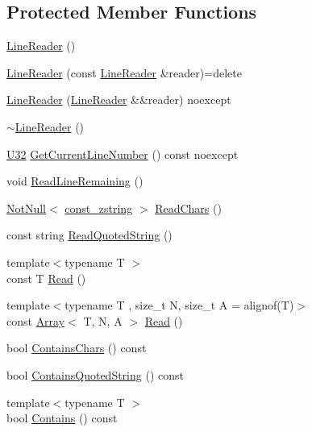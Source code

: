 \subsection*{Protected Member Functions}
\begin{DoxyCompactItemize}
\item 
\mbox{\hyperlink{classmage_1_1_line_reader_ab4a46321d7ea3ecda2d6390c78a7285b}{Line\+Reader}} ()
\item 
\mbox{\hyperlink{classmage_1_1_line_reader_ae4f871bebae110704b34c0bd88460639}{Line\+Reader}} (const \mbox{\hyperlink{classmage_1_1_line_reader}{Line\+Reader}} \&reader)=delete
\item 
\mbox{\hyperlink{classmage_1_1_line_reader_ae90c546a98e113a48ca1c94b854a4866}{Line\+Reader}} (\mbox{\hyperlink{classmage_1_1_line_reader}{Line\+Reader}} \&\&reader) noexcept
\item 
\mbox{\hyperlink{classmage_1_1_line_reader_ad9753ea392ebe5b3867852d3392fb1e7}{$\sim$\+Line\+Reader}} ()
\item 
\mbox{\hyperlink{namespacemage_a41c104c036fba3756a74e19f793eeaa1}{U32}} \mbox{\hyperlink{classmage_1_1_line_reader_aa0ed768e2799b74f2341c56fc6ac4969}{Get\+Current\+Line\+Number}} () const noexcept
\item 
void \mbox{\hyperlink{classmage_1_1_line_reader_a3a4b99bfef1e8a826d74a01bcc663fcb}{Read\+Line\+Remaining}} ()
\item 
\mbox{\hyperlink{namespacemage_a8769f9d670d6b585ea306cb1062af94b}{Not\+Null}}$<$ \mbox{\hyperlink{namespacemage_abfd9206dc607ceb5d13ec68bf075a5c0}{const\+\_\+zstring}} $>$ \mbox{\hyperlink{classmage_1_1_line_reader_afcb163cbc75ad1650437d809bbbc2d9b}{Read\+Chars}} ()
\item 
const string \mbox{\hyperlink{classmage_1_1_line_reader_ae9a7547d01b29c3237b198444d4f3aef}{Read\+Quoted\+String}} ()
\item 
{\footnotesize template$<$typename T $>$ }\\const T \mbox{\hyperlink{classmage_1_1_line_reader_a9bbad433ab93ce012aec7155adafbedb}{Read}} ()
\item 
{\footnotesize template$<$typename T , size\+\_\+t N, size\+\_\+t A = alignof(\+T)$>$ }\\const \mbox{\hyperlink{structmage_1_1_array}{Array}}$<$ T, N, A $>$ \mbox{\hyperlink{classmage_1_1_line_reader_a208eb25a7715761178317eec72c93c75}{Read}} ()
\item 
bool \mbox{\hyperlink{classmage_1_1_line_reader_a0369e06fa3b38ecb22ffd5892759225f}{Contains\+Chars}} () const
\item 
bool \mbox{\hyperlink{classmage_1_1_line_reader_a99b4fa47fc341ad4fda112ea9505efcb}{Contains\+Quoted\+String}} () const
\item 
{\footnotesize template$<$typename T $>$ }\\bool \mbox{\hyperlink{classmage_1_1_line_reader_a3401db2b0ecd15d8048a1b321eceb77a}{Contains}} () const
\end{DoxyCompactItemize}
